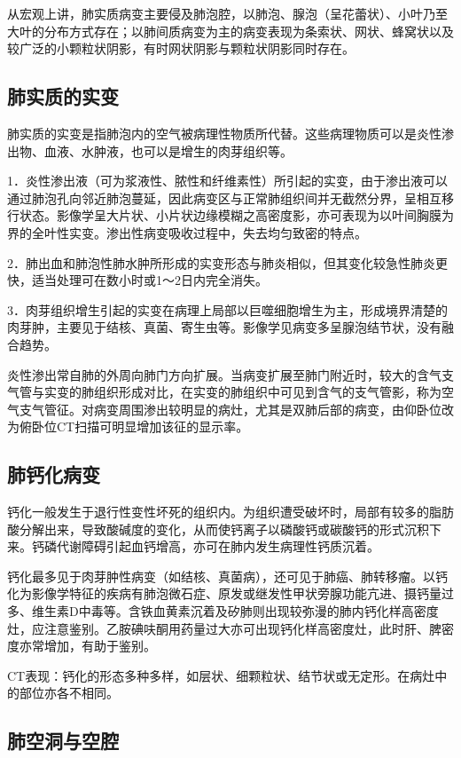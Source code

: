 从宏观上讲，肺实质病变主要侵及肺泡腔，以肺泡、腺泡（呈花蕾状）、小叶乃至大叶的分布方式存在；以肺间质病变为主的病变表现为条索状、网状、蜂窝状以及较广泛的小颗粒状阴影，有时网状阴影与颗粒状阴影同时存在。

\subsection{肺实质的实变}

肺实质的实变是指肺泡内的空气被病理性物质所代替。这些病理物质可以是炎性渗出物、血液、水肿液，也可以是增生的肉芽组织等。

1．炎性渗出液（可为浆液性、脓性和纤维素性）所引起的实变，由于渗出液可以通过肺泡孔向邻近肺泡蔓延，因此病变区与正常肺组织间并无截然分界，呈相互移行状态。影像学呈大片状、小片状边缘模糊之高密度影，亦可表现为以叶间胸膜为界的全叶性实变。渗出性病变吸收过程中，失去均匀致密的特点。

2．肺出血和肺泡性肺水肿所形成的实变形态与肺炎相似，但其变化较急性肺炎更快，适当处理可在数小时或1～2日内完全消失。

3．肉芽组织增生引起的实变在病理上局部以巨噬细胞增生为主，形成境界清楚的肉芽肿，主要见于结核、真菌、寄生虫等。影像学见病变多呈腺泡结节状，没有融合趋势。

炎性渗出常自肺的外周向肺门方向扩展。当病变扩展至肺门附近时，较大的含气支气管与实变的肺组织形成对比，在实变的肺组织中可见到含气的支气管影，称为空气支气管征。对病变周围渗出较明显的病灶，尤其是双肺后部的病变，由仰卧位改为俯卧位CT扫描可明显增加该征的显示率。

\subsection{肺钙化病变}

钙化一般发生于退行性变性坏死的组织内。为组织遭受破坏时，局部有较多的脂肪酸分解出来，导致酸碱度的变化，从而使钙离子以磷酸钙或碳酸钙的形式沉积下来。钙磷代谢障碍引起血钙增高，亦可在肺内发生病理性钙质沉着。

钙化最多见于肉芽肿性病变（如结核、真菌病），还可见于肺癌、肺转移瘤。以钙化为影像学特征的疾病有肺泡微石症、原发或继发性甲状旁腺功能亢进、摄钙量过多、维生素D中毒等。含铁血黄素沉着及矽肺则出现较弥漫的肺内钙化样高密度灶，应注意鉴别。乙胺碘呋酮用药量过大亦可出现钙化样高密度灶，此时肝、脾密度亦常增加，有助于鉴别。

CT表现：钙化的形态多种多样，如层状、细颗粒状、结节状或无定形。在病灶中的部位亦各不相同。

\subsection{肺空洞与空腔}


